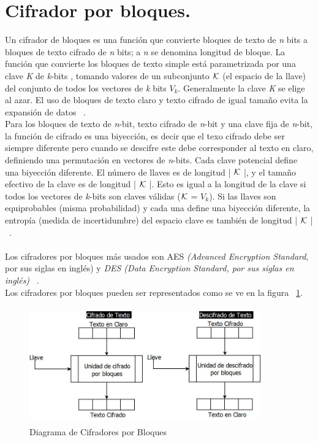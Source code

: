 \section{Cifrador por bloques. }

Un cifrador de bloques es una función que convierte bloques de texto de \textit{n} bits a bloques de texto cifrado de \textit{n}  bits; a \textit{n}  se denomina longitud de bloque. La función que convierte los bloques de texto simple está parametrizada por una clave \textit{K} de \textit{ k}-bits , tomando valores de un subconjunto $\cal{K}$ (el espacio de la llave) del conjunto de todos los vectores de \textit{k} bits $V_{\textit{k}}$. Generalmente la clave \textit{K} se elige al azar. El uso de bloques de texto claro y texto cifrado de igual tamaño evita la expansión de datos ~\cite{menezes}. \\

Para los bloques de texto de \textit{n}-bit, texto cifrado de \textit{n}-bit y una clave fija de \textit{n}-bit, la función de cifrado es
una biyección, es decir que el texo cifrado debe ser siempre diferente pero cuando se descifre este debe corresponder al texto en claro, definiendo una permutación en vectores de \textit{n}-bits. Cada clave potencial define una biyección diferente. El número de llaves es de longitud | $\cal{K}$ |, y el tamaño efectivo de la clave es de longitud | $\cal{K}$ |. Esto es igual a la longitud de la clave si todos los vectores de \textit{k}-bits son claves válidas ($\cal{K}$ = $V_{\textit{k}}$). Si las llaves son equiprobables (misma probabilidad) y cada una define una biyección diferente, la entropía (medida de incertidumbre) del espacio clave es también de longitud | $\cal K$ | ~\cite{menezes}. \\ \\


Los cifradores por bloques más usados son AES \textit{(Advanced Encryption Standard}, por sus 
siglas en ingl\'es) y \textit{DES (Data Encryption Standard, por sus siglas en inglés)} ~\cite{bloques}.\\ 

Los cifradores por bloques pueden ser representados como se ve en la figura ~\ref{fig:2-5-1}.

\begin{figure}[H]
\centering
	\includegraphics[width=10cm, height=5cm]{./images/CifradoBloques.jpeg}
	\caption{Diagrama de Cifradores por Bloques}
	\label{fig:2-5-1}
\end{figure}

